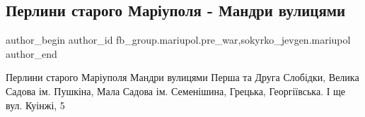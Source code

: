  
 
 
 
 

\subsection{Перлини старого Маріуполя - Мандри вулицями}
\label{sec:05_03_2023.fb.fb_group.mariupol.pre_war.3.perlini_starogo_mar_}
 
\ifcmt
 author_begin
   author_id fb_group.mariupol.pre_war,sokyrko_jevgen.mariupol
 author_end
\fi

Перлини старого Маріуполя Мандри вулицями Перша та Друга Слобідки, Велика
Садова ім. Пушкіна, Мала Садова ім. Семенішина, Грецька, Георгіївська. І ще
вул. Куінжі, 5

